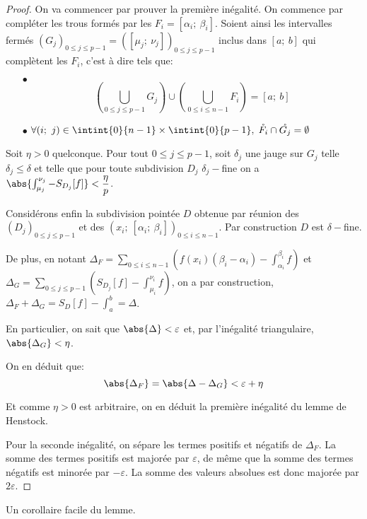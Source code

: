 \begin{proof}
On va commencer par prouver la première inégalité. On commence par compléter les trous formés par les $F_i=[\alpha_i;~\beta_i]$. Soient ainsi les intervalles fermés $(G_j)_{0 \leq j \leq p-1}=([\mu_j;~\nu_j])_{0 \leq j \leq p-1}$ inclus dans $[a;~b]$ qui complètent les $F_i$, c'est à dire tels que:
\begin{itemize}
\item[$\bullet$]
\[
\left (\bigcup \limits_{0 \leq j \leq p-1} G_j \right ) \cup \left ( \bigcup \limits_{0 \leq i \leq n-1} F_i \right ) = [a;~b]
\]
\item[$\bullet$]
$\forall (i;~j) \in \intint{0}{n-1} \times \intint{0}{p-1}, \; \mathring{F_i} \cap \mathring{G_j} = \emptyset$
\end{itemize}

Soit $\eta>0$ quelconque. Pour tout $0 \leq j \leq p-1$, soit $\delta_j$ une jauge sur $G_j$ telle $\delta_j \leq \delta$ et telle que pour toute subdivision $D_j$ $\delta_j-$fine on a $\abs{\int_{\mu_j}^{\nu_j} - S_{D_j}[f]} < \dfrac{\eta}{p}$.

Considérons enfin la subdivision pointée $D$ obtenue par réunion des $(D_j)_{0 \leq j \leq p-1}$ et des $(x_i;~[\alpha_i;~\beta_i])_{0 \leq i \leq n-1}$. Par construction $D$ est $\delta-$fine.

De plus, en notant $\Delta_F = \displaystyle{\sum \limits_{0 \leq i \leq n-1}} \left (f(x_i) (\beta_i-\alpha_i) - \int_{\alpha_i}^{\beta_i} f \right )$ et $\Delta_G = \displaystyle{\sum \limits_{0 \leq j \leq p-1}} \left (S_{D_j}[f] - \int_{\mu_i}^{\nu_i} f \right )$, on a par construction, $\Delta_F + \Delta_G = S_D[f] - \int_a^b = \Delta$.

En particulier, on sait que $\abs{\Delta} < \varepsilon$ et, par l'inégalité triangulaire, $\abs{\Delta_G} < \eta$.

On en déduit que:
\[
\abs{\Delta_F} = \abs{\Delta - \Delta_G} < \varepsilon + \eta
\]

Et comme $\eta>0$ est arbitraire, on en déduit la première inégalité du lemme de Henstock.

Pour la seconde inégalité, on sépare les termes positifs et négatifs de $\Delta_F$. La somme des termes positifs est majorée par $\varepsilon$, de même que la somme des termes négatifs est minorée par $-\varepsilon$. La somme des valeurs absolues est donc majorée par $2\varepsilon$.
\end{proof}

Un corollaire facile du lemme.

